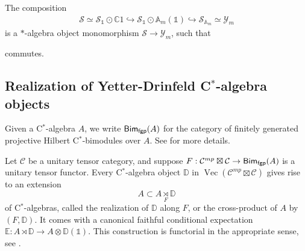 \documentclass[a4paper,11pt,reqno]{amsart}
\numberwithin{equation}{section}
\theoremstyle{remark}
\theoremstyle{definition}
\newcommand{\C}{\mathbb C}
\newcommand{\bA}{\mathbb A}
\newcommand{\bE}{\mathbb E}
\newcommand{\bD}{\mathbb D}
\newcommand{\cC}{\mathcal C}
\newcommand{\cS}{\mathcal S}
\newcommand{\cY}{\mathcal Y}
\newcommand{\fgpBim}{{\sf Bim_{fgp}}}
\DeclareMathOperator{\Vect}{Vec}
\newcommand\un{{\mathds 1}}
\begin{document}
The composition
\begin{align*}
	\cS \simeq \cS_{\un} \odot \C 1 \hookrightarrow \cS_{\un} \odot \bA_m(\un) \hookrightarrow \cS_{\bA_m} \simeq \cY_m
\end{align*}
is a $*$-algebra object monomorphism $\cS \to \cY_m$, such that
\begin{center}
\end{center}
commutes.


\subsection{Realization of Yetter-Drinfeld C$^*$-algebra objects}

Given a C$^*$-algebra $A$, we write $\fgpBim(A)$ for the category of finitely generated projective Hilbert C$^*$-bimodules over $A$. See \cite{Hataishi_Palomares_2025} for more details.

Let $\cC$ be a unitary tensor category, and suppose $F: \cC^{mp} \boxtimes \cC \to \fgpBim(A)$ is a unitary tensor functor. Every C$^*$-algebra object  $\bD$ in $\Vect(\cC^{mp} \boxtimes \cC)$ gives rise to an extension
\[
A \subset A \underset{F}{\rtimes} \bD
\]
of C$^*$-algebras, called the realization of $\bD$ along $F$, or the cross-product of $A$ by $(F,\bD)$. It comes with a canonical faithful conditional expectation $\bE: A \rtimes \bD \to A \otimes \bD(\un)$. This construction is functorial in the appropriate sense, see \cite{Hataishi_Palomares_2025}.
\end{document}
